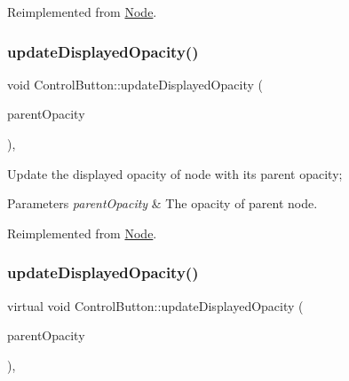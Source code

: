 Reimplemented from \hyperlink{classNode_ac733bae7b9590f8da746cbc3d1337a2f}{Node}.

\mbox{\label{classControlButton_a51a1da3e1972b7e1d98e2318feaf498e}} 
\subsubsection{\texorpdfstring{update\+Displayed\+Opacity()}{updateDisplayedOpacity()}\hspace{0.1cm}{\footnotesize\ttfamily [1/2]}}
{\footnotesize\ttfamily void Control\+Button\+::update\+Displayed\+Opacity (\begin{DoxyParamCaption}\item[{G\+Lubyte}]{parent\+Opacity }\end{DoxyParamCaption})\hspace{0.3cm}{\ttfamily [override]}, {\ttfamily [virtual]}}

Update the displayed opacity of node with it\textquotesingle{}s parent opacity; 
\begin{DoxyParams}{Parameters}
{\em parent\+Opacity} & The opacity of parent node. \\
\hline
\end{DoxyParams}


Reimplemented from \hyperlink{classNode_a3a0122884e7e1ce310b8b68abfbb245b}{Node}.

\mbox{\label{classControlButton_a0d46b6a123c22e09c50e786b6dd5c68f}} 
\subsubsection{\texorpdfstring{update\+Displayed\+Opacity()}{updateDisplayedOpacity()}\hspace{0.1cm}{\footnotesize\ttfamily [2/2]}}
{\footnotesize\ttfamily virtual void Control\+Button\+::update\+Displayed\+Opacity (\begin{DoxyParamCaption}\item[{G\+Lubyte}]{parent\+Opacity }\end{DoxyParamCaption})\hspace{0.3cm}{\ttfamily [override]}, {\ttfamily [virtual]}}

